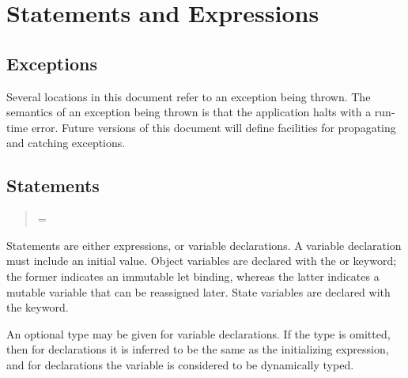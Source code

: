 \section{Statements and Expressions}

\subsection{Exceptions}

Several locations in this document refer to an exception being thrown.
The semantics of an exception being thrown is that the application
halts with a run-time error.  Future versions of this document will
define facilities for propagating and catching exceptions.

\subsection{Statements}


\begin{quote}

 {}

 {}

 {}



 {}   = 


 {}  



 {}

 {}

\end{quote}

Statements are either expressions, or variable declarations.  A
variable declaration must include an initial value.  Object variables are
declared with the  or  keyword; the former
indicates an immutable let binding, whereas the latter indicates a
mutable variable that can be reassigned later. State variables are 
declared with the  keyword. 

An optional type may be given for variable declarations.  If the type
is omitted, then for  declarations it is inferred to be the
same as the initializing expression, and for  declarations
the variable is considered to be dynamically typed.

